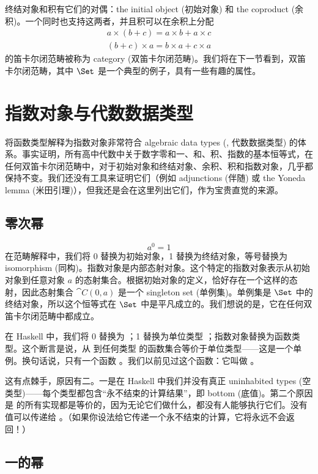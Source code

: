 终结对象和积有它们的对偶：the initial object (初始对象) 和 the coproduct (余积)。一个同时也支持这两者，并且积可以在余积上分配
\begin{gather*}
  a \times (b + c) = a \times b + a \times c \\
  (b + c) \times a = b \times a + c \times a
\end{gather*}
的笛卡尔闭范畴被称为  category (双笛卡尔闭范畴)。我们将在下一节看到，双笛卡尔闭范畴，其中 $\Set$ 是一个典型的例子，具有一些有趣的属性。

\section{指数对象与代数数据类型}

将函数类型解释为指数对象非常符合 algebraic data types (, 代数数据类型) 的体系。事实证明，所有高中代数中关于数字零和一、和、积、指数的基本恒等式，在任何双笛卡尔闭范畴中，对于初始对象和终结对象、余积、积和指数对象，几乎都保持不变。我们还没有工具来证明它们（例如 adjunctions (伴随) 或 the Yoneda lemma (米田引理)），但我还是会在这里列出它们，作为宝贵直觉的来源。

\subsection{零次幂}

\[a^{0} = 1\]
在范畴解释中，我们将 0 替换为初始对象，1 替换为终结对象，等号替换为 isomorphism (同构)。指数对象是内部态射对象。这个特定的指数对象表示从初始对象到任意对象 $a$ 的态射集合。根据初始对象的定义，恰好存在一个这样的态射，因此态射集合 $\cat{C}(0, a)$ 是一个 singleton set (单例集)。单例集是 $\Set$ 中的终结对象，所以这个恒等式在 $\Set$ 中是平凡成立的。我们想说的是，它在任何双笛卡尔闭范畴中都成立。

在 Haskell 中，我们将 0 替换为 ；1 替换为单位类型 \code{()}；指数对象替换为函数类型。这个断言是说，从  到任何类型  的函数集合等价于单位类型——这是一个单例。换句话说，只有一个函数 。我们以前见过这个函数：它叫做 。

这有点棘手，原因有二。一是在 Haskell 中我们并没有真正 uninhabited types (空类型)——每个类型都包含“永不结束的计算结果”，即 bottom (底值)。第二个原因是  的所有实现都是等价的，因为无论它们做什么，都没有人能够执行它们。没有值可以传递给 。（如果你设法给它传递一个永不结束的计算，它将永远不会返回！）

\subsection{一的幂}

